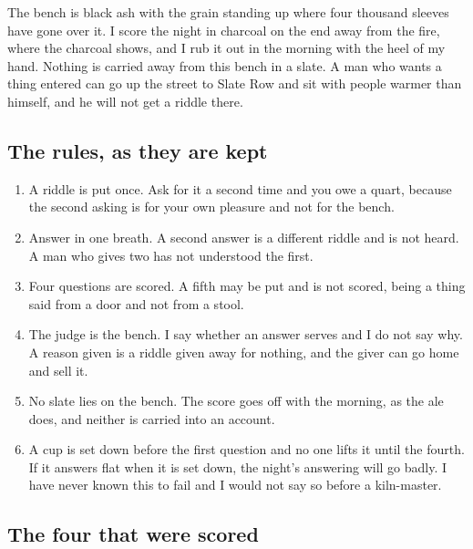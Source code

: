 \documentclass{design/chronicle}
\begin{document}
The bench is black ash with the grain standing up where four thousand sleeves have gone over it. I score the night in charcoal on the end away from the fire, where the charcoal shows, and I rub it out in the morning with the heel of my hand. Nothing is carried away from this bench in a slate. A man who wants a thing entered can go up the street to Slate Row and sit with people warmer than himself, and he will not get a riddle there.

\subsection*{The rules, as they are kept}

\begin{enumerate}[leftmargin=1.4em,itemsep=1pt,topsep=3pt,parsep=0pt]

\item A riddle is put once. Ask for it a second time and you owe a quart, because the second asking is for your own pleasure and not for the bench.

\item Answer in one breath. A second answer is a different riddle and is not heard. A man who gives two has not understood the first.

\item Four questions are scored. A fifth may be put and is not scored, being a thing said from a door and not from a stool.

\item The judge is the bench. I say whether an answer serves and I do not say why. A reason given is a riddle given away for nothing, and the giver can go home and sell it.

\item No slate lies on the bench. The score goes off with the morning, as the ale does, and neither is carried into an account.

\item A cup is set down before the first question and no one lifts it until the fourth. If it answers flat when it is set down, the night’s answering will go badly. I have never known this to fail and I would not say so before a kiln-master.

\end{enumerate}

\subsection*{The four that were scored}
\end{document}
